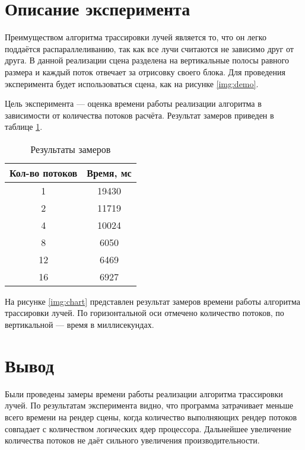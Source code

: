 
\section{Описание эксперимента}

Преимуществом алгоритма трассировки лучей является то, что он легко поддаётся распараллеливанию, так как все лучи считаются не зависимо друг от друга. 
В данной реализации сцена разделена на вертикальные полосы равного размера и каждый поток отвечает за отрисовку своего блока. Для проведения эксперимента будет использоваться сцена, как на рисунке \ref{img:demo}.

Цель эксперимента --- оценка времени работы реализации алгоритма в зависимости от количества потоков расчёта.
Результат замеров приведен в таблице \ref{tbl:time}.

\begin{table}[h]
    \begin{center}
        \begin{threeparttable}
        \captionsetup{justification=raggedright,singlelinecheck=off}
        \caption{Результаты замеров}
        \label{tbl:time}
        \begin{tabular}{|c|c|}
            \hline
			Кол-во потоков&Время, мс\\\hline
            1   & 19430 \\\hline
            2   & 11719  \\\hline
            4   & 10024  \\\hline
            8   & 6050  \\\hline
            12  & 6469  \\\hline
            16  & 6927  \\\hline
		\end{tabular}
    \end{threeparttable}
\end{center}
\end{table}

На рисунке \ref{img:chart} представлен результат замеров времени работы алгоритма трассировки лучей. По горизонтальной оси отмечено количество потоков, по вертикальной --- время в миллисекундах.


\clearpage

\section{Вывод}

Были проведены замеры времени работы реализации алгоритма трассировки лучей. По результатам эксперимента видно, что программа затрачивает меньше всего времени на рендер сцены, когда количество выполняющих рендер потоков совпадает с количеством логических ядер процессора. Дальнейшее увеличение количества потоков не даёт сильного увеличения производительности.